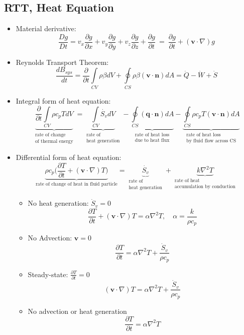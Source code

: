 \documentclass[12pt,a4paper]{article}
\begin{document}
\subsection{RTT, Heat Equation}
\begin{itemize}
    \item Material derivative: \[\frac{Dg}{Dt} = v_{x}\frac{\partial g}{\partial x}+v_{y}\frac{\partial g}{\partial y}+v_{z}\frac{\partial g}{\partial z}+ \frac{\partial g}{\partial t} \ = \ \frac{\partial g}{\partial t}+(\mathbf{v}\cdot \nabla)g\]
	\item Reynolds Transport Theorem: \[ \frac{dB_{sys}}{dt}=\frac{\partial}{\partial t}\int\limits_{CV}\rho \beta dV+\oint\limits_{CS}\rho\beta(\mathbf{v}\cdot\mathbf{n})dA = \dot{Q}-\dot{W}+\dot{S}\]

	\item Integral form of heat equation: \[\underbrace{\frac{\partial}{\partial t} \int\limits_{CV} \rho c_{p} T dV}_{\substack{\text{rate of change}\\\text{of thermal energy}}} = \underbrace{\int\limits_{CV} \dot{S_{v}} dV}_{\substack{\text{rate of}\\ \text{heat generation}}} - \underbrace{\oint\limits_{CS} (\mathbf{q} \cdot \mathbf{n}) dA}_{\substack{\text{rate of heat loss}\\\text{due to heat flux}}} - \underbrace{\oint\limits_{CS} \rho c_{p} T (\mathbf{v} \cdot \mathbf{n}) dA}_{\substack{\text{rate of heat loss}\\ \text{by fluid flow across CS}}} \]

	\item Differential form of heat equation: \[ \underbrace{\rho c_{p}\bigg(\frac{\partial T}{\partial t} +(\mathbf{v} \cdot \nabla)  T\bigg)}_{\text{rate of change of heat in fluid particle}} = \underbrace{\dot{S_{v}}}_{\substack{\text{rate of} \\ \text{heat generation}}}  + \underbrace{k \nabla^{2} T}_{\substack{\text{rate of heat} \\ \text{accumulation by conduction}}} \]

		\begin{itemize}
		\item No heat generation: $\dot{S}_{v}=0$ \[ \frac{\partial T}{\partial t} +(\mathbf{v} \cdot \nabla)  T =  \alpha \nabla^{2} T, \quad \alpha=\frac{k}{\rho c_{p}} \] 
		\item No Advection: $\mathbf{v}=0$ \[ \frac{\partial T}{\partial t} =  \alpha \nabla^{2} T + \frac{\dot{S}_{v}}{\rho c_{p}} \]
		\item Steady-state: $\frac{\partial T}{\partial t}=0$ \[ (\mathbf{v} \cdot \nabla) T = \alpha \nabla^{2} T + \frac{\dot{S}_{v}}{\rho c_{p}} \]
		\item No advection or heat generation \[ \frac{\partial T}{\partial t} = \alpha \nabla^{2} T \]
		\end{itemize}
\end{itemize}
\end{document}

